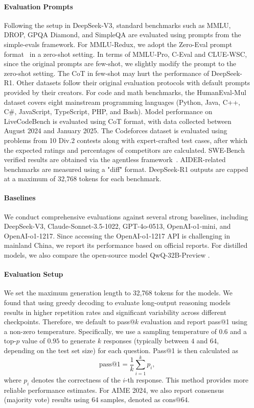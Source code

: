 \documentclass[11pt, a4paper, logo, copyright, nonumbering]{deepseek}
\newcommand{\dsri}{DeepSeek-R1}
\begin{document}
{\paragraph{Evaluation Prompts} Following the setup in DeepSeek-V3, standard benchmarks such as MMLU, DROP, GPQA Diamond, and SimpleQA are evaluated using prompts from the simple-evals framework. For MMLU-Redux, we adopt the Zero-Eval prompt format~\citep{Lin_ZeroEval_A_Unified_2024} in a zero-shot setting. In terms of MMLU-Pro, C-Eval and CLUE-WSC, since the original prompts are few-shot, we slightly modify the prompt to the zero-shot setting. The CoT in few-shot may hurt the performance of  \dsri{}. 
Other datasets follow their original evaluation protocols with default prompts provided by their creators. 
For code and math benchmarks, the HumanEval-Mul dataset covers eight mainstream programming languages (Python, Java, C++, C\#, JavaScript, TypeScript, PHP, and Bash). 
Model performance on LiveCodeBench is evaluated using  CoT format, with data collected between August 2024 and January 2025. The Codeforces dataset is evaluated using problems from 10 Div.2 contests along with expert-crafted test cases, after which the expected ratings and percentages of competitors are calculated. SWE-Bench verified results are obtained via the agentless framework~\citep{agentless}. AIDER-related benchmarks are measured using a "diff" format.
\dsri{} outputs are capped at a maximum of 32,768 tokens for each benchmark.


\paragraph{Baselines} We conduct comprehensive evaluations against several strong baselines, including DeepSeek-V3, Claude-Sonnet-3.5-1022, GPT-4o-0513, OpenAI-o1-mini, and OpenAI-o1-1217. Since accessing the OpenAI-o1-1217 API is challenging in mainland China, we report its performance based on official reports.
For distilled models, we also compare the open-source model QwQ-32B-Preview \citep{QwQ}.




\paragraph{Evaluation Setup}
We set the maximum generation length to 32,768 tokens for the models.
We found that using greedy decoding to evaluate long-output reasoning models results in higher repetition rates and significant variability across different checkpoints.
Therefore, we default to pass@$k$ evaluation \citep{codex} and report pass@1 using a non-zero temperature.
Specifically, we use a sampling temperature of $0.6$ and a top-$p$ value of $0.95$ to generate $k$ responses (typically between $4$ and $64$, depending on the test set size) for each question. Pass@1 is then calculated as
\[
\text{pass@1} = \frac{1}{k} \sum_{i=1}^{k} p_i,
\]
where $p_i$ denotes the correctness of the $i$-th response. This method provides more reliable performance estimates.
For AIME 2024, we also report consensus (majority vote) results \citep{wang2022self} using $64$ samples, denoted as $\text{cons}@64$.


}
\end{document}
